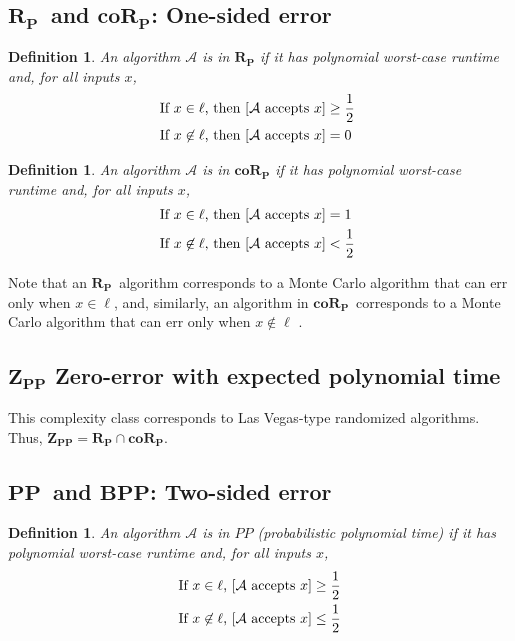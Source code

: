 \documentclass[11pt]{article}
\let\Pr\relax
\DeclareMathOperator*{\Pr}{\mathbb{P}}
\newcommand{\PP}{\ensuremath{\mathbf{PP}}}
\newcommand{\BPP}{\ensuremath{\mathbf{BPP}}}
\newcommand{\ZPP}{\ensuremath{\mathbf{Z_{PP}}}}
\newcommand{\RP}{\ensuremath{\mathbf{R_{P}}}}
\newcommand{\coRP}{\ensuremath{\mathbf{coR_{P}}}}
\newcommand{\Alg}{\ensuremath{\mathcal{A}}}
\newtheorem{definition}[theorem]{Definition}
\begin{document}
\subsection{\RP\ and \coRP: One-sided error }

\begin{definition}
An algorithm $\Alg$ is in $\RP$ if it has polynomial worst-case runtime and, for all inputs $x$,
\begin{align*}
  &\text{If $x \in \ell$, then $\Pr[\Alg \text{ accepts } x] \ge \frac12 $ } \\
  &\text{If $x \not\in \ell$, then $\Pr[\Alg \text{ accepts } x] = 0 $ }
\end{align*}
\end{definition}

\begin{definition}
An algorithm $\Alg$ is in $\coRP$ if it has polynomial worst-case runtime and, for all inputs $x$,
\begin{align*}
  &\text{If $x \in \ell$, then $\Pr[\Alg \text{ accepts } x] = 1 $ } \\
  &\text{If $x \not\in \ell$, then $\Pr[\Alg \text{ accepts } x] < \frac12 $ }
\end{align*}
\end{definition}

Note that an \RP\ algorithm corresponds to a Monte Carlo algorithm that can err only when $x \in \ell$, and, similarly, an algorithm in \coRP\ corresponds to a Monte Carlo algorithm that can err only when $x \notin \ell$ \cite{MR}.

\subsection{\ZPP\: Zero-error with expected polynomial time}

This complexity class corresponds to Las Vegas-type randomized algorithms. Thus, $\ZPP = \RP \cap \coRP$.

\subsection{\PP\ and \BPP: Two-sided error }

\begin{definition}
An algorithm $\Alg$ is in $PP$ (probabilistic polynomial time) if it has polynomial worst-case runtime and, for all inputs $x$,
\begin{align*}
  &\text{If $x \in \ell$, $\Pr[\Alg \text{ accepts } x] \ge \frac12$} \\
  &\text{If $x \not\in \ell$, $\Pr[\Alg \text{ accepts } x] \le \frac12$}
\end{align*}
\end{definition}
\end{document}

